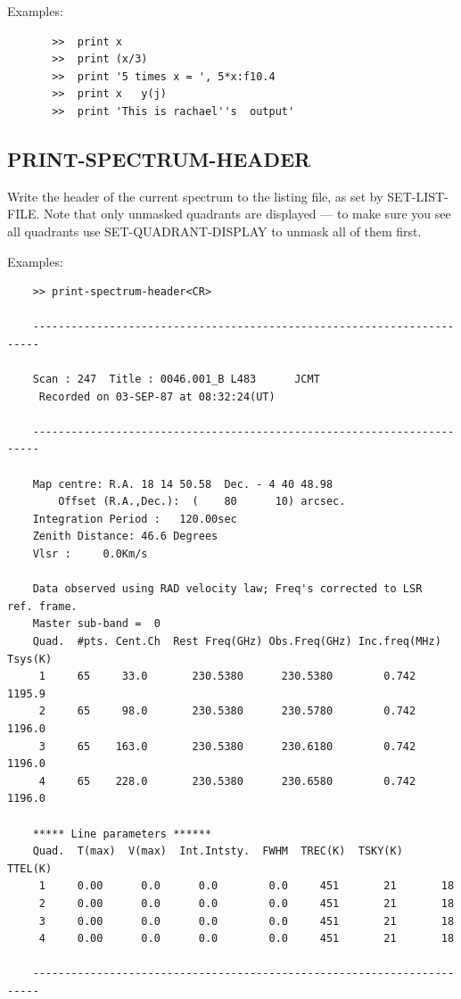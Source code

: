\documentclass[11pt,twoside]{report}
\begin{document}
Examples:  
\begin{verbatim}
       >>  print x
       >>  print (x/3)
       >>  print '5 times x = ', 5*x:f10.4
       >>  print x   y(j)
       >>  print 'This is rachael''s  output'
\end{verbatim}

\subsection{PRINT-SPECTRUM-HEADER} 

Write the header of the current spectrum to the listing file, as set by
SET-LIST-FILE. Note that only unmasked quadrants are displayed --- to make
sure you see all quadrants use SET-QUADRANT-DISPLAY to unmask all of them
first.

Examples:
\begin{verbatim}
    >> print-spectrum-header<CR>

    -----------------------------------------------------------------------

    Scan : 247  Title : 0046.001_B L483      JCMT 
     Recorded on 03-SEP-87 at 08:32:24(UT)

    -----------------------------------------------------------------------

    Map centre: R.A. 18 14 50.58  Dec. - 4 40 48.98
        Offset (R.A.,Dec.):  (    80      10) arcsec.
    Integration Period :   120.00sec
    Zenith Distance: 46.6 Degrees
    Vlsr :     0.0Km/s

    Data observed using RAD velocity law; Freq's corrected to LSR  ref. frame.
    Master sub-band =  0
    Quad.  #pts. Cent.Ch  Rest Freq(GHz) Obs.Freq(GHz) Inc.freq(MHz) Tsys(K)
     1     65     33.0       230.5380      230.5380        0.742    1195.9    
     2     65     98.0       230.5380      230.5780        0.742    1196.0    
     3     65    163.0       230.5380      230.6180        0.742    1196.0    
     4     65    228.0       230.5380      230.6580        0.742    1196.0    

    ***** Line parameters ******
    Quad.  T(max)  V(max)  Int.Intsty.  FWHM  TREC(K)  TSKY(K)  TTEL(K)
     1     0.00      0.0      0.0        0.0     451       21       18
     2     0.00      0.0      0.0        0.0     451       21       18
     3     0.00      0.0      0.0        0.0     451       21       18
     4     0.00      0.0      0.0        0.0     451       21       18

    -----------------------------------------------------------------------

\end{verbatim}
\end{document}
